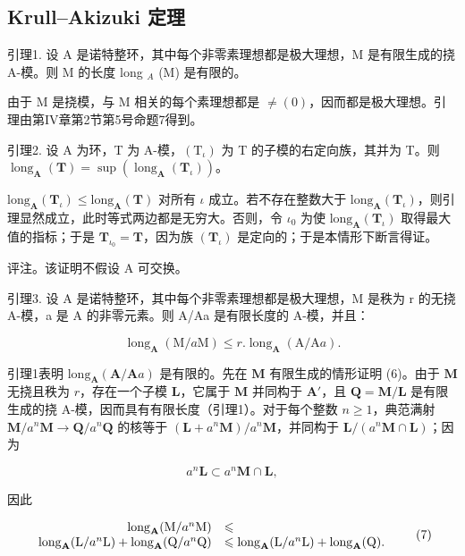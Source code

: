 \subsection{Krull–Akizuki 定理}

引理1. 设 A 是诺特整环，其中每个非零素理想都是极大理想，M 是有限生成的挠 A-模。则 M 的长度 long \(_{A}\) (M) 是有限的。

由于 M 是挠模，与 M 相关的每个素理想都是 \(\neq(0)\)，因而都是极大理想。引理由第IV章第2节第5号命题7得到。

引理2. 设 A 为环，T 为 A-模，\((\mathrm{T}_{\iota})\) 为 T 的子模的右定向族，其并为 T。则 \(\operatorname{long}_{\mathbf{A}}(\mathbf{T}) = \sup (\operatorname{long}_{\mathbf{A}}(\mathbf{T}_{\iota}))\)。

\(\text{long}_{\mathbf{A}}(\mathbf{T}_{\iota}) \leqslant \text{long}_{\mathbf{A}}(\mathbf{T})\) 对所有 \(\iota\) 成立。若不存在整数大于 \(\text{long}_{\mathbf{A}}(\mathbf{T}_{\iota})\)，则引理显然成立，此时等式两边都是无穷大。否则，令 \(\iota_{0}\) 为使 \(\text{long}_{\mathbf{A}}(\mathbf{T}_{\iota})\) 取得最大值的指标；于是 \(\mathbf{T}_{\iota_{0}} = \mathbf{T}\)，因为族 \((\mathbf{T}_{\iota})\) 是定向的；于是本情形下断言得证。

评注。该证明不假设 A 可交换。

引理3. 设 A 是诺特整环，其中每个非零素理想都是极大理想，M 是秩为 r 的无挠 A-模，a 是 A 的非零元素。则 A/Aa 是有限长度的 A-模，并且：

\[
\operatorname{long} _ {\mathbf {A}} (\mathrm{M} / a \mathrm{M}) \leqslant r. \operatorname{long} _ {\mathbf {A}} (\mathrm{A} / \mathrm{A} a).\tag{6}
\]

引理1表明 \(\mathrm{long}_{\mathbf{A}}(\mathbf{A} / \mathbf{A}a)\) 是有限的。先在 \(\mathbf{M}\) 有限生成的情形证明 (6)。由于 \(\mathbf{M}\) 无挠且秩为 \(r\)，存在一个子模 \(\mathbf{L}\)，它属于 \(\mathbf{M}\) 并同构于 \(\mathbf{A}'\)，且 \(\mathbf{Q} = \mathbf{M} / \mathbf{L}\) 是有限生成的挠 A-模，因而具有有限长度（引理1）。对于每个整数 \(n \geqslant 1\)，典范满射 \(\mathbf{M} / a^n\mathbf{M} \to \mathbf{Q} / a^n\mathbf{Q}\) 的核等于 \((\mathbf{L} + a^n\mathbf{M}) / a^n\mathbf{M}\)，并同构于 \(\mathbf{L} / (a^n\mathbf{M} \cap \mathbf{L})\)；因为

\[
a ^ {n} \mathbf {L} \subset a ^ {n} \mathbf {M} \cap \mathbf {L},
\]

因此

\[
\begin{array}{r l} \operatorname{long} _ {\mathbf {A}} (\mathrm{M} / a ^ {n} \mathrm{M}) & \leqslant \\ \operatorname{long} _ {\mathbf {A}} (\mathrm{L} / a ^ {n} \mathrm{L}) + \operatorname{long} _ {\mathbf {A}} (\mathrm{Q} / a ^ {n} \mathrm{Q}) & \leqslant \operatorname{long} _ {\mathbf {A}} (\mathrm{L} / a ^ {n} \mathrm{L}) + \operatorname{long} _ {\mathbf {A}} (\mathrm{Q}). \end{array} \tag {7}
\]

